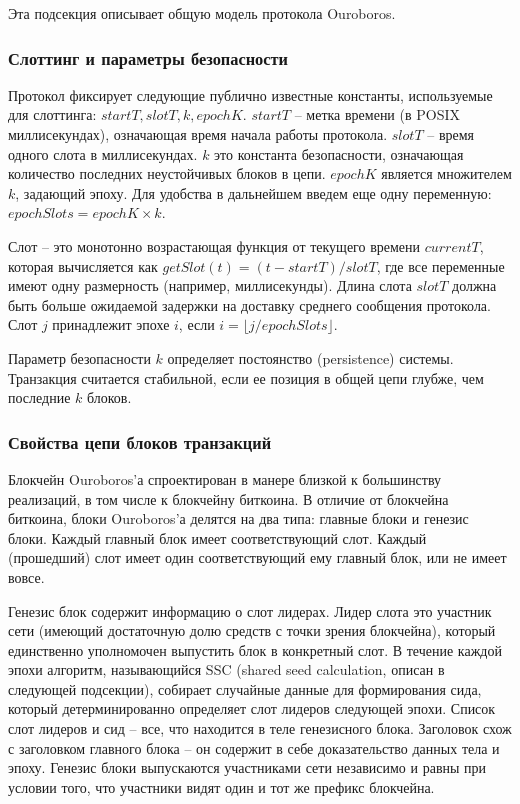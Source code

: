 \documentclass[specification,annotation]{itmo-student-thesis}
\begin{document}
Эта подсекция описывает общую модель протокола Ouroboros.

\subsubsection{Слоттинг и параметры безопасности}

Протокол фиксирует следующие публично известные константы,
используемые для слоттинга: $startT, slotT, k, epochK$. $startT$ --
метка времени (в POSIX миллисекундах), означающая время начала работы
протокола. $slotT$ -- время одного слота в миллисекундах. $k$ это
константа безопасности, означающая количество последних неустойчивых
блоков в цепи. $epochK$ является множителем $k$, задающий эпоху. Для
удобства в дальнейшем введем еще одну переменную: $epochSlots = epochK
\times k$.

Слот -- это монотонно возрастающая функция от текущего времени
$currentT$, которая вычисляется как $getSlot(t) = (t - startT) /
slotT$, где все переменные имеют одну размерность (например,
миллисекунды). Длина слота $slotT$ должна быть больше ожидаемой
задержки на доставку среднего сообщения протокола.  Слот $j$
принадлежит эпохе $i$, если $i = \lfloor j / epochSlots \rfloor$.

Параметр безопасности $k$ определяет постоянство (persistence)
системы. Транзакция считается стабильной, если ее позиция в общей цепи
глубже, чем последние $k$ блоков.

\subsubsection{Свойства цепи блоков транзакций}

Блокчейн Ouroboros'а спроектирован в манере близкой к большинству
реализаций, в том числе к блокчейну биткоина. В отличие от
блокчейна биткоина, блоки Ouroboros'а делятся на два типа: главные
блоки и генезис блоки. Каждый главный блок имеет соответствующий
слот. Каждый (прошедший) слот имеет один соответствующий ему главный
блок, или не имеет вовсе.

Генезис блок содержит информацию о слот лидерах. Лидер слота это
участник сети (имеющий достаточную долю средств с точки зрения
блокчейна), который единственно уполномочен выпустить блок в
конкретный слот. В течение каждой эпохи алгоритм, называющийся SSC
(shared seed calculation, описан в следующей подсекции), собирает
случайные данные для формирования сида, который детерминированно
определяет слот лидеров следующей эпохи. Список слот лидеров и сид --
все, что находится в теле генезисного блока. Заголовок схож с
заголовком главного блока -- он содержит в себе доказательство данных
тела и эпоху. Генезис блоки выпускаются участниками сети независимо и
равны при условии того, что участники видят один и тот же префикс
блокчейна.
\end{document}
